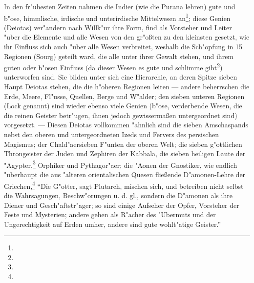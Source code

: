 \documentclass[a4paper, 11pt, oneside, polutonikogreek, german]{article}
\begin{document}
In den fr"uhesten Zeiten nahmen die Indier (wie die Purana lehren) gute und b"ose, himmlische, irdische und unterirdische Mittelwesen an\footnote{}; diese Genien (Deiotas) ver"andern nach Willk"ur ihre Form, find als Vorsteher und Leiter "uber die Elemente und alle Wesen von den gr"oßten zu den kleinsten gesetzt, wie ihr Einfluss sich auch "uber alle Wesen verbreitet, weshalb die Sch"opfung in 15 Regionen (Sourg) geteilt ward, die alle unter ihrer Gewalt stehen, und ihrem guten oder b"osen Einfluss (da dieser Wesen es gute und schlimme gibt\footnote{}) unterworfen sind. Sie bilden unter sich eine Hierarchie, an deren Spitze sieben Haupt Deiotas stehen, die die h"oheren Regionen leiten --- andere beherrschen die Erde, Meere, Fl"usse, Quellen, Berge und W"alder; den sieben unteren Regionen (Lock genannt) sind wieder ebenso viele Genien (b"ose, verderbende Wesen, die die reinen Geister betr"ugen, ihnen jedoch gewissermaßen untergeordnet sind) vorgesetzt. --- Diesen Deiotas vollkommen "ahnlich sind die sieben Amschaspands nebst den oberen und untergeordneten Izeds und Fervers des persischen Magismus; der Chald"aersieben F"unten der oberen Welt; die sieben g"ottlichen Throngeister der Juden und Zephiren der Kabbala, die sieben heiligen Laute der "Agypter,\footnote{} Orphiker und Pythagor"aer; die "Aonen der Gnostiker, wie endlich "uberhaupt die aus "alteren orientalischen Quesen fließende D"amonen-Lehre der Griechen,\footnote{} "`Die G"otter, sagt Plutarch, mischen sich, und betreiben nicht selbst die Wahrsagungen, Beschw"orungen u. d. gl., sondern die D"amonen als ihre Diener und Gesch"aftstr"ager; so sind einige Aufseher der Opfer, Vorsteher der Feste und Mysterien; andere gehen als R"acher des "Ubermuts und der Ungerechtigkeit auf Erden umher, andere sind gute wohlt"atige Geister."'
\end{document}
